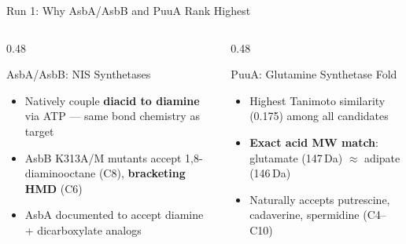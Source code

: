 \documentclass[aspectratio=169, 11pt]{beamer}
\begin{document}
\begin{frame}{Run 1: Why AsbA/AsbB and PuuA Rank Highest}
\vspace{6pt}
\begin{columns}[T]
\begin{column}{0.48\textwidth}
\begin{block}{\scriptsize AsbA/AsbB: NIS Synthetases}
\vspace{-2pt}
\begin{itemize}\scriptsize
\setlength\itemsep{1pt}
\item Natively couple \textbf{diacid to diamine} via ATP --- same bond chemistry as target
\item AsbB K313A/M mutants accept 1,8-diaminooctane (C8), \textbf{bracketing HMD} (C6)
\item AsbA documented to accept diamine + dicarboxylate analogs
\end{itemize}
\end{block}
\end{column}
\begin{column}{0.48\textwidth}
\begin{block}{\scriptsize PuuA: Glutamine Synthetase Fold}
\vspace{-2pt}
\begin{itemize}\scriptsize
\setlength\itemsep{1pt}
\item Highest Tanimoto similarity (0.175) among all candidates
\item \textbf{Exact acid MW match}: glutamate (147\,Da) $\approx$ adipate (146\,Da)
\item Naturally accepts putrescine, cadaverine, spermidine (C4--C10)
\end{itemize}
\end{block}
\end{column}
\end{columns}
\end{frame}
\end{document}
